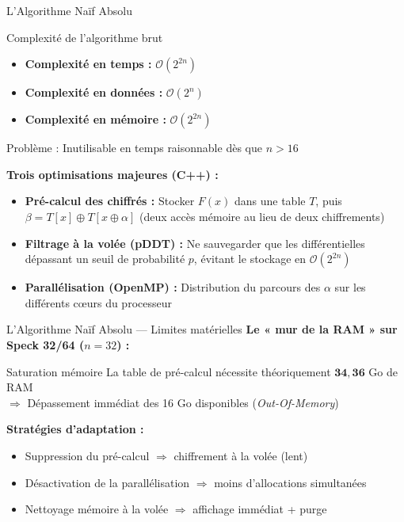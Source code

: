 \documentclass[10pt]{beamer}
\begin{document}
\begin{frame}{L'Algorithme Naïf Absolu} %
    
    \begin{block}{Complexité de l'algorithme brut}
    \begin{itemize}
        \item \textbf{Complexité en temps :} $\mathcal{O}(2^{2n})$
        \item \textbf{Complexité en données :} $\mathcal{O}(2^n)$
        \item \textbf{Complexité en mémoire :} $\mathcal{O}(2^{2n})$
    \end{itemize}
    \end{block}

    \begin{alertblock}{}
        Problème : Inutilisable en temps raisonnable dès que $n > 16$ 
    \end{alertblock}
    
    \textbf{Trois optimisations majeures (C++) :}
    \begin{itemize}
        \item \textbf{Pré-calcul des chiffrés :} Stocker $F(x)$ dans une table $T$, puis $\beta = T[x] \oplus T[x \oplus \alpha]$ (deux accès mémoire au lieu de deux chiffrements)
        \item \textbf{Filtrage à la volée (pDDT) :} Ne sauvegarder que les différentielles dépassant un seuil de probabilité $p$, évitant le stockage en $\mathcal{O}(2^{2n})$
        \item \textbf{Parallélisation (OpenMP) :} Distribution du parcours des $\alpha$ sur les différents cœurs du processeur
    \end{itemize}

\end{frame}

 
\begin{frame}{L'Algorithme Naïf Absolu — Limites matérielles} %
    \textbf{Le « mur de la RAM » sur Speck 32/64 ($n=32$) :}
 
    \begin{block}{Saturation mémoire}
        La table de pré-calcul nécessite théoriquement $\mathbf{34{,}36}$ Go de RAM \\
        $\Rightarrow$ Dépassement immédiat des 16 Go disponibles (\textit{Out-Of-Memory})
    \end{block}
 
    \textbf{Stratégies d'adaptation :}
    \begin{itemize}
        \item Suppression du pré-calcul $\Rightarrow$ chiffrement à la volée (lent)
        \item Désactivation de la parallélisation $\Rightarrow$ moins d'allocations simultanées
        \item Nettoyage mémoire à la volée $\Rightarrow$ affichage immédiat + purge
    \end{itemize}
\end{frame}
\end{document}
